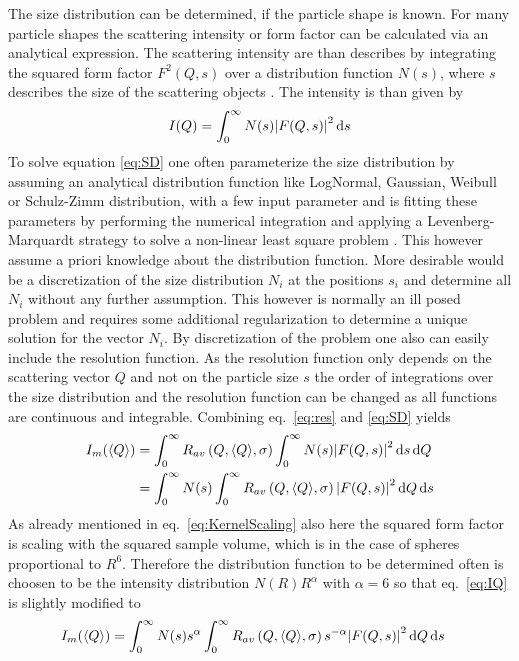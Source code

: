 The size distribution can be determined, if the particle shape is known. For many particle shapes the scattering intensity or form factor can be calculated via an analytical expression. The scattering intensity are than describes by integrating the squared form factor $F^2(Q,s)$ over a distribution function $N(s)$, where $s$ describes the size of the scattering objects \cite{Pedersen1997}. The intensity is than given by
\begin{equation} \label{eq:SD}
I(Q) = \int_0^\infty N(s) \abs{F(Q,s)}^2 \, \mathrm{d}s
\end{equation}
To solve equation \ref{eq:SD} one often parameterize the size distribution by assuming an analytical distribution function like LogNormal, Gaussian, Weibull or Schulz-Zimm distribution, with a few input parameter and is fitting these parameters by performing the numerical integration and applying a Levenberg-Marquardt strategy to solve a non-linear least square problem \cite{Bressler2015}. This however assume a priori knowledge about the distribution function. More desirable would be a discretization of the size distribution $N_i$ at the positions $s_i$ and determine all $N_i$ without any further assumption. This however is normally an ill posed problem and requires some additional regularization to determine a unique solution for the vector $N_i$. By discretization of the problem one also can easily include the resolution function. As the resolution function only depends on the scattering vector $Q$ and not on the particle size $s$ the order of integrations over the size distribution and the resolution function can be changed as all functions are continuous and integrable. Combining eq.\ \ref{eq:res} and \ref{eq:SD} yields
\begin{align}
I_m(\langle Q\rangle) &= \int_0^\infty R_{av}\left(Q,\langle
Q\rangle,\sigma\right)  \int_0^\infty N(s) \abs{F(Q,s)}^2 \, \mathrm{d}s \, \mathrm{d}Q \\
&= \int_0^\infty N(s)  \int_0^\infty R_{av}\left(Q,\langle
Q\rangle,\sigma\right) \abs{F(Q,s)}^2 \, \mathrm{d}Q \, \mathrm{d}s \label{eq:IQ}
\end{align}
As already mentioned in eq.\ \ref{eq:KernelScaling} also here the squared form factor is scaling with the squared sample volume, which is in the case of spheres proportional to $R^6$. Therefore the distribution function to be determined often is choosen to be the intensity distribution $N(R)R^\alpha$ with $\alpha=6$ so that eq.\ \ref{eq:IQ} is slightly modified to
\begin{align}
I_m(\langle Q\rangle) &=  \int_0^\infty N(s)s^\alpha  \int_0^\infty R_{av}\left(Q,\langle
Q\rangle,\sigma\right) s^{-\alpha}\abs{F(Q,s)}^2 \, \mathrm{d}Q \, \mathrm{d}s
\end{align}
